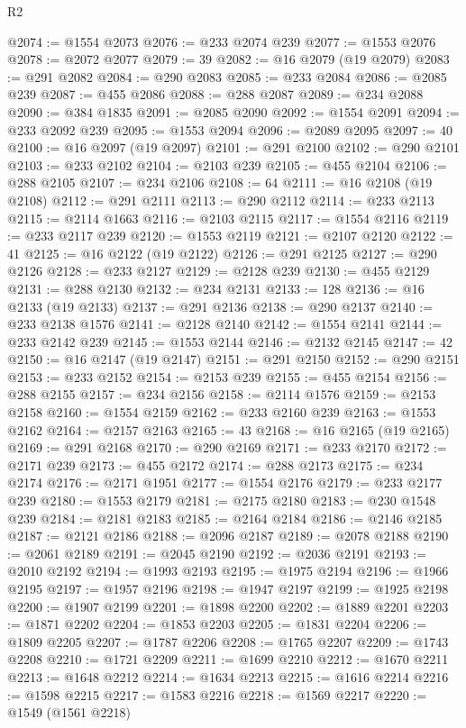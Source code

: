 \begin{lexlean}{R2}
\begin{coremodule}
@2074 := @1554 @2073
@2076 := @233 @2074 @239
@2077 := @1553 @2076
@2078 := @2072 @2077
@2079 := 39
@2082 := @16 @2079 (@19 @2079)
@2083 := @291 @2082
@2084 := @290 @2083
@2085 := @233 @2084
@2086 := @2085 @239
@2087 := @455 @2086
@2088 := @288 @2087
@2089 := @234 @2088
@2090 := @384 @1835
@2091 := @2085 @2090
@2092 := @1554 @2091
@2094 := @233 @2092 @239
@2095 := @1553 @2094
@2096 := @2089 @2095
@2097 := 40
@2100 := @16 @2097 (@19 @2097)
@2101 := @291 @2100
@2102 := @290 @2101
@2103 := @233 @2102
@2104 := @2103 @239
@2105 := @455 @2104
@2106 := @288 @2105
@2107 := @234 @2106
@2108 := 64
@2111 := @16 @2108 (@19 @2108)
@2112 := @291 @2111
@2113 := @290 @2112
@2114 := @233 @2113
@2115 := @2114 @1663
@2116 := @2103 @2115
@2117 := @1554 @2116
@2119 := @233 @2117 @239
@2120 := @1553 @2119
@2121 := @2107 @2120
@2122 := 41
@2125 := @16 @2122 (@19 @2122)
@2126 := @291 @2125
@2127 := @290 @2126
@2128 := @233 @2127
@2129 := @2128 @239
@2130 := @455 @2129
@2131 := @288 @2130
@2132 := @234 @2131
@2133 := 128
@2136 := @16 @2133 (@19 @2133)
@2137 := @291 @2136
@2138 := @290 @2137
@2140 := @233 @2138 @1576
@2141 := @2128 @2140
@2142 := @1554 @2141
@2144 := @233 @2142 @239
@2145 := @1553 @2144
@2146 := @2132 @2145
@2147 := 42
@2150 := @16 @2147 (@19 @2147)
@2151 := @291 @2150
@2152 := @290 @2151
@2153 := @233 @2152
@2154 := @2153 @239
@2155 := @455 @2154
@2156 := @288 @2155
@2157 := @234 @2156
@2158 := @2114 @1576
@2159 := @2153 @2158
@2160 := @1554 @2159
@2162 := @233 @2160 @239
@2163 := @1553 @2162
@2164 := @2157 @2163
@2165 := 43
@2168 := @16 @2165 (@19 @2165)
@2169 := @291 @2168
@2170 := @290 @2169
@2171 := @233 @2170
@2172 := @2171 @239
@2173 := @455 @2172
@2174 := @288 @2173
@2175 := @234 @2174
@2176 := @2171 @1951
@2177 := @1554 @2176
@2179 := @233 @2177 @239
@2180 := @1553 @2179
@2181 := @2175 @2180
@2183 := @230 @1548 @239
@2184 := @2181 @2183
@2185 := @2164 @2184
@2186 := @2146 @2185
@2187 := @2121 @2186
@2188 := @2096 @2187
@2189 := @2078 @2188
@2190 := @2061 @2189
@2191 := @2045 @2190
@2192 := @2036 @2191
@2193 := @2010 @2192
@2194 := @1993 @2193
@2195 := @1975 @2194
@2196 := @1966 @2195
@2197 := @1957 @2196
@2198 := @1947 @2197
@2199 := @1925 @2198
@2200 := @1907 @2199
@2201 := @1898 @2200
@2202 := @1889 @2201
@2203 := @1871 @2202
@2204 := @1853 @2203
@2205 := @1831 @2204
@2206 := @1809 @2205
@2207 := @1787 @2206
@2208 := @1765 @2207
@2209 := @1743 @2208
@2210 := @1721 @2209
@2211 := @1699 @2210
@2212 := @1670 @2211
@2213 := @1648 @2212
@2214 := @1634 @2213
@2215 := @1616 @2214
@2216 := @1598 @2215
@2217 := @1583 @2216
@2218 := @1569 @2217
@2220 := @1549 (@1561 @2218)

\end{coremodule}
\end{lexlean}
